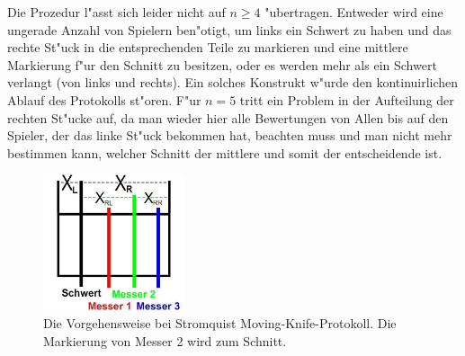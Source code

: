 \documentclass[11pt, a4paper, twoside]{article}
\newcommand{\wf}{\color{white}}
\newtheorem{bsp}[satz]{Beispiel}
\numberwithin{equation}{section}
\begin{document}
Die Prozedur l"asst sich leider nicht auf $n \geq 4$ "ubertragen. Entweder wird eine ungerade Anzahl von Spielern ben"otigt, um links ein Schwert zu haben und das rechte St"uck in die entsprechenden Teile zu markieren und eine mittlere Markierung f"ur den Schnitt zu besitzen, oder es werden mehr als ein Schwert verlangt (von links und rechts). Ein solches Konstrukt w"urde den kontinuirlichen Ablauf des Protokolls st"oren. F"ur $n=5$ tritt ein Problem in der Aufteilung der rechten St"ucke auf, da man wieder hier alle Bewertungen von Allen bis auf den Spieler, der das linke  St"uck bekommen hat, beachten muss und man nicht mehr bestimmen kann, welcher Schnitt der mittlere und somit der entscheidende ist.\\
\begin{figure}[h!]
\center
\includegraphics[height=4cm]{str.jpg}
\caption[Vorgehensweise bei Stromquist Moving-Knife-Protokoll]{Die Vorgehensweise bei Stromquist Moving-Knife-Protokoll. Die Markierung von Messer 2 wird zum Schnitt.}
\end{figure}
\end{document}
